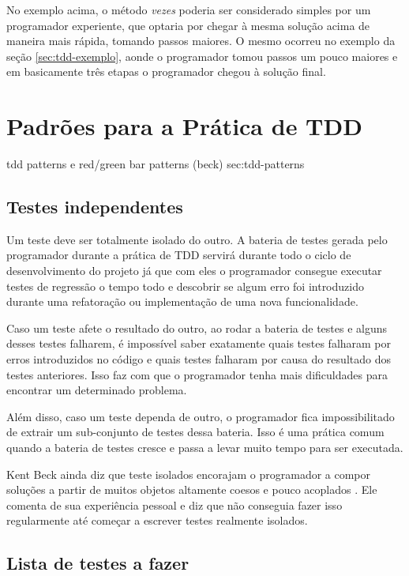 No exemplo acima, o método \textit{vezes} poderia ser considerado simples por um programador experiente, que optaria por chegar à
mesma solução acima de maneira mais rápida, tomando passos maiores. O mesmo ocorreu no exemplo da seção \ref{sec:tdd-exemplo}, aonde o
programador tomou passos um pouco maiores e em basicamente três etapas o programador chegou à solução final.

\section{Padrões para a Prática de TDD}
\label{sec:tdd-patterns}

tdd patterns e red/green bar patterns (beck) sec:tdd-patterns

\subsection{Testes independentes}

Um teste deve ser totalmente isolado do outro. A bateria de testes gerada pelo programador durante a prática de TDD servirá
durante todo o ciclo de desenvolvimento do projeto já que com eles o programador consegue executar testes de regressão
o tempo todo e descobrir se algum erro foi introduzido durante uma refatoração ou implementação de uma nova funcionalidade.

Caso um teste afete o resultado do outro, ao rodar a bateria de testes e alguns desses testes falharem, é impossível
saber exatamente quais testes falharam por erros introduzidos no código e quais testes falharam por causa do resultado
dos testes anteriores. Isso faz com que o programador tenha mais dificuldades para encontrar um determinado problema.

Além disso, caso um teste dependa de outro, o programador fica impossibilitado de extrair um sub-conjunto de testes dessa
bateria. Isso é uma prática comum quando a bateria de testes cresce e passa a levar muito tempo para ser executada.

Kent Beck ainda diz que teste isolados encorajam o programador a compor soluções a partir de muitos objetos altamente coesos
e pouco acoplados \cite{TDDByExample}. Ele comenta de sua experiência pessoal e diz que não conseguia fazer isso regularmente até
começar a escrever testes realmente isolados. 

\subsection{Lista de testes a fazer}

